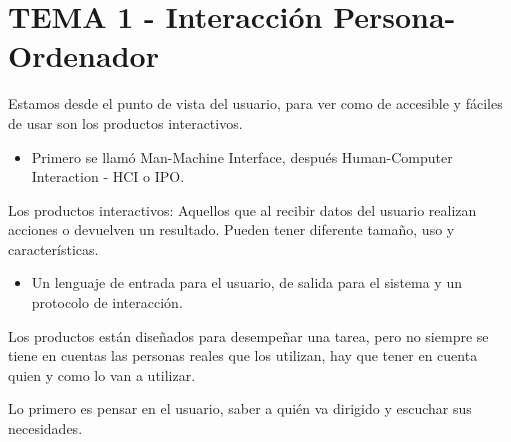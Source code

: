\documentclass[12pt, twoside, openright]{report} %
\begin{document}
\chapter{TEMA 1 - Interacción Persona-Ordenador}
Estamos desde el punto de vista del usuario, para ver como de
accesible y fáciles de usar son los productos interactivos.

\begin{itemize}
	\item Primero se llamó Man-Machine Interface, después Human-Computer
	      Interaction - HCI o IPO.
\end{itemize}

Los productos interactivos: Aquellos que al recibir datos del
usuario realizan acciones o devuelven un resultado. Pueden tener
diferente tamaño, uso y características.

\begin{itemize}
	\item Un lenguaje de entrada para el usuario, de salida para el sistema
	      y un protocolo de interacción.
\end{itemize}

Los productos están diseñados para desempeñar una tarea, pero no
siempre se tiene en cuentas las personas reales que los utilizan,
hay que tener en cuenta quien y como lo van a utilizar.

Lo primero es pensar en el usuario, saber a quién va dirigido y
escuchar sus necesidades.
\end{document}
